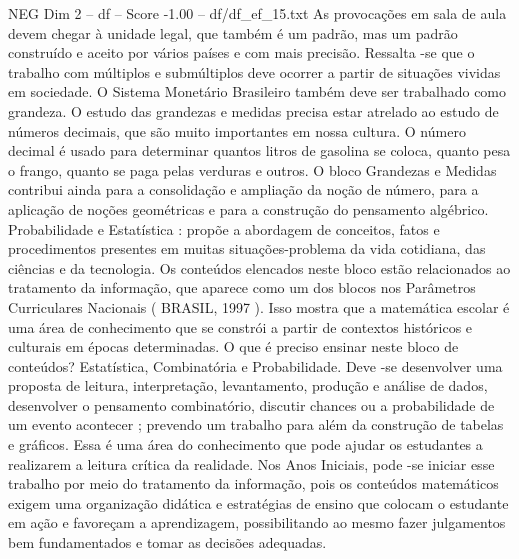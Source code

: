 \begin{textsample}{NEG Dim 2 – df – Score -1.00 – df/df\_ef\_15.txt}
As provocações em sala de aula devem chegar à unidade legal, que também é um padrão, mas um padrão construído e aceito por vários países e com mais precisão.
Ressalta -se que o trabalho com múltiplos e submúltiplos deve ocorrer a partir de situações vividas em sociedade.
O Sistema Monetário Brasileiro também deve ser trabalhado como grandeza.
O estudo das grandezas e medidas precisa estar atrelado ao estudo de números decimais, que são muito importantes em nossa cultura.
O número decimal é usado para determinar quantos litros de gasolina se coloca, quanto pesa o frango, quanto se paga pelas verduras e outros.
O bloco Grandezas e Medidas contribui ainda para a consolidação e ampliação da noção de número, para a aplicação de noções geométricas e para a construção do pensamento algébrico.
Probabilidade e Estatística : propõe a abordagem de conceitos, fatos e procedimentos presentes em muitas situações-problema da vida cotidiana, das ciências e da tecnologia.
Os conteúdos elencados neste bloco estão relacionados ao tratamento da informação, que aparece como um dos blocos nos Parâmetros Curriculares Nacionais ( BRASIL, 1997 ).
Isso mostra que a matemática escolar é uma área de conhecimento que se constrói a partir de contextos históricos e culturais em épocas determinadas.
O que é preciso ensinar neste bloco de conteúdos?
Estatística, Combinatória e Probabilidade.
Deve -se desenvolver uma proposta de leitura, interpretação, levantamento, produção e análise de dados, desenvolver o pensamento combinatório, discutir chances ou a probabilidade de um evento acontecer ; prevendo um trabalho para além da construção de tabelas e gráficos.
Essa é uma área do conhecimento que pode ajudar os estudantes a realizarem a leitura crítica da realidade.
Nos Anos Iniciais, pode -se iniciar esse trabalho por meio do tratamento da informação, pois os conteúdos matemáticos exigem uma organização didática e estratégias de ensino que colocam o estudante em ação e favoreçam a aprendizagem, possibilitando ao mesmo fazer julgamentos bem fundamentados e tomar as decisões adequadas.

\end{textsample}
